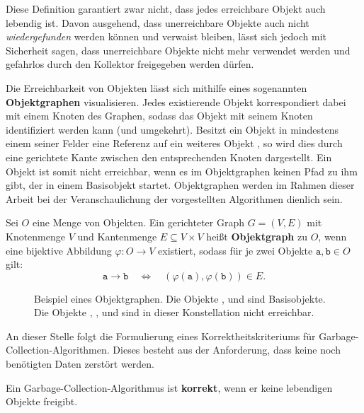 Diese Definition garantiert zwar nicht, dass jedes erreichbare Objekt auch lebendig ist.
Davon ausgehend, dass unerreichbare Objekte auch nicht \textit{wiedergefunden} werden können und verwaist bleiben, lässt sich jedoch mit Sicherheit sagen, dass unerreichbare Objekte nicht mehr verwendet werden und gefahrlos durch den Kollektor freigegeben werden dürfen.

Die Erreichbarkeit von Objekten lässt sich mithilfe eines sogenannten \textbf{Objektgraphen} visualisieren.
Jedes existierende Objekt korrespondiert dabei mit einem Knoten des Graphen, sodass das Objekt mit seinem Knoten identifiziert werden kann (und umgekehrt).
Besitzt ein Objekt  in mindestens einem seiner Felder eine Referenz auf ein weiteres Objekt , so wird dies durch eine gerichtete Kante zwischen den entsprechenden Knoten dargestellt.
Ein Objekt ist somit nicht erreichbar, wenn es im Objektgraphen keinen Pfad zu ihm gibt, der in einem Basisobjekt startet.
Objektgraphen werden im Rahmen dieser Arbeit bei der Veranschaulichung der vorgestellten Algorithmen dienlich sein.

	
\begin{mybox}
\begin{defn}[Objektgraph]
	Sei $O$ eine Menge von Objekten.
	Ein gerichteter Graph $G = (V,E)$ mit Knotenmenge $V$ und Kantenmenge $E \subseteq V \times V$ heißt \textbf{Objektgraph} zu $O$, wenn eine bijektive Abbildung $\varphi \colon O \rightarrow V$ existiert, sodass für je zwei Objekte $\mathtt{a,b} \in O$ gilt:
	\[
		\mathtt{a} \rightarrow \mathtt{b} \quad \Leftrightarrow \quad (\varphi(\mathtt{a}),\varphi(\mathtt{b})) \in E.
	\]
\end{defn}
\end{mybox}

\begin{figure}[h]
	\centering
	
	\caption[Beispiel eines Objektgraphen]{Beispiel eines Objektgraphen. Die Objekte ,  und  sind Basisobjekte. Die Objekte , ,  und  sind in dieser Konstellation nicht erreichbar.}
\end{figure}

An dieser Stelle folgt die Formulierung eines Korrektheitskriteriums für Garbage-Collection-Algorithmen.
Dieses besteht aus der Anforderung, dass keine noch benötigten Daten zerstört werden.

\begin{mybox}
\begin{defn}
	Ein Garbage-Collection-Algorithmus ist \textbf{korrekt}, wenn er keine lebendigen Objekte freigibt.
\end{defn}
\end{mybox}

